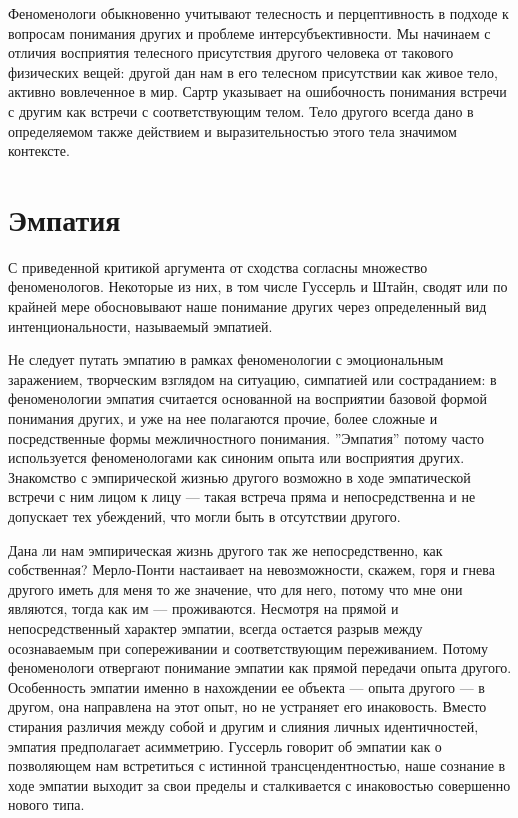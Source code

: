 \documentclass[11pt]{book}
\begin{document}
Феноменологи обыкновенно учитывают телесность и перцептивность в подходе к вопросам понимания других и проблеме интерсубъективности. Мы начинаем с отличия восприятия телесного присутствия другого человека от такового физических вещей: другой дан нам в его телесном присутствии как живое тело, активно вовлеченное в мир. Сартр указывает на ошибочность понимания встречи с другим как встречи с соответствующим телом. Тело другого всегда дано в определяемом также действием и выразительностью этого тела значимом контексте.

\section{Эмпатия}

С приведенной критикой аргумента от сходства согласны множество феноменологов. Некоторые из них, в том числе Гуссерль и Штайн, сводят или по крайней мере обосновывают наше понимание других через определенный вид интенциональности, называемый эмпатией.

Не следует путать эмпатию в рамках феноменологии с эмоциональным заражением, творческим взглядом на ситуацию, симпатией или состраданием: в феноменологии эмпатия считается основанной на восприятии базовой формой понимания других, и уже на нее полагаются прочие, более сложные и посредственные формы межличностного понимания. ''Эмпатия'' потому часто используется феноменологами как синоним опыта или восприятия других. Знакомство с эмпирической жизнью другого возможно в ходе эмпатической встречи с ним лицом к лицу --- такая встреча пряма и непосредственна и не допускает тех убеждений, что могли быть в отсутствии другого.

Дана ли нам эмпирическая жизнь другого так же непосредственно, как собственная? Мерло-Понти настаивает на невозможности, скажем, горя и гнева другого иметь для меня то же значение, что для него, потому что мне они являются, тогда как им --- проживаются. Несмотря на прямой и непосредственный характер эмпатии, всегда остается разрыв между осознаваемым при сопереживании и соответствующим переживанием. Потому феноменологи отвергают понимание эмпатии как прямой передачи опыта другого. Особенность эмпатии именно в нахождении ее объекта --- опыта другого --- в другом, она направлена на этот опыт, но не устраняет его инаковость. Вместо стирания различия между собой и другим и слияния личных идентичностей, эмпатия предполагает асимметрию. Гуссерль говорит об эмпатии как о позволяющем нам встретиться с истинной трансцендентностью, наше сознание в ходе эмпатии выходит за свои пределы и сталкивается с инаковостью совершенно нового типа.
\end{document}
